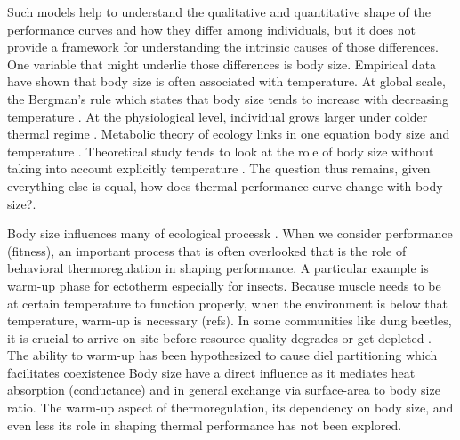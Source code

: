 Such models help to understand the qualitative and quantitative shape of the performance curves and how they differ  among individuals, but it does not provide a framework for understanding the intrinsic causes of those differences. %
One variable that might underlie those differences is body size.
Empirical data have shown that body size is often associated with temperature.  
At global scale, the Bergman's rule which states that body size tends to increase with decreasing temperature \citep{Bergman1847}.
At the physiological level, individual grows larger under colder thermal regime \citep{Van1996}.
Metabolic theory of ecology links in one equation body size and temperature \citep{Gillooly2001}.
Theoretical study tends to look at the role of body size without taking into account explicitly temperature \citep[e.g.,][]{Yodzis1992, Brown1993}.
The question thus remains, given everything else is equal, how does thermal performance curve change with body size?.

Body size influences many of ecological processk \citep{Peters1986}.
When we consider performance (fitness), an important process that is often overlooked that is the role of behavioral thermoregulation in shaping performance. 
A particular example is warm-up phase for ectotherm especially for insects.
Because muscle needs to be at certain temperature to function properly, when the environment is below that temperature, warm-up is necessary (refs). 
In some communities like dung beetles, it is crucial to arrive on site before resource quality degrades or get depleted \citep{Hanski1991}. %
The ability to warm-up has been hypothesized to cause diel partitioning which facilitates coexistence \citep{Viljanen2009}
Body size have a direct influence as it mediates heat absorption (conductance) and in general exchange via surface-area to body size ratio.
The warm-up aspect of thermoregulation, its dependency on body size, and even less its role in shaping thermal performance has not been explored.
 
